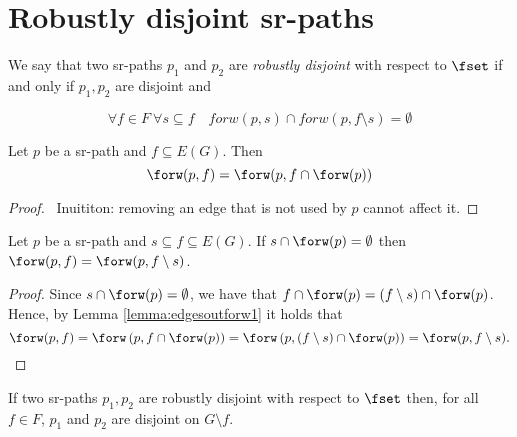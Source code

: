 \chapter{Robustly disjoint sr-paths}

We say that two sr-paths $p_1$ and $p_2$ are \emph{robustly disjoint} with respect to $\fset$ if and only if $p_1, p_2$ are disjoint and 

$$
\forall f \in F \ \forall s \subseteq f \quad forw(p, s) \cap forw(p, f \setminus s) = \emptyset
$$


\begin{lemma}
\label{lemma:edgesoutforw1}
Let $p$ be a sr-path and $f \subseteq E(G)$. Then
$$
\forw(p, f) = \forw(p, f \cap \forw(p))
$$
\end{lemma}

\begin{proof}
\todo~Inuititon: removing an edge that is not used by $p$ cannot affect it.
\end{proof}

\begin{corollary}
\label{cor:edgesoutforw2}
Let $p$ be a sr-path and $s \subseteq f \subseteq E(G)$. If $s \cap \forw(p) = \emptyset$ then $\forw(p, f) = \forw(p, f \setminus s)$.
\end{corollary}

\begin{proof}
Since $s \cap \forw(p) = \emptyset$, we have that $f \cap \forw(p) = (f \setminus s) \cap \forw(p)$.
Hence, by Lemma \ref{lemma:edgesoutforw1} it holds that
$$
\forw(p, f) = \forw \left(p, f \cap \forw(p) \right) = \forw \left(p, (f \setminus s) \cap \forw(p)\right) = \forw(p, f \setminus s).
$$
\end{proof}

\begin{theorem}
If two sr-paths $p_1, p_2$ are robustly disjoint with respect to $\fset$ then,
for all $f \in F$, $p_1$ and $p_2$ are disjoint on $G \setminus f$.
\end{theorem}

